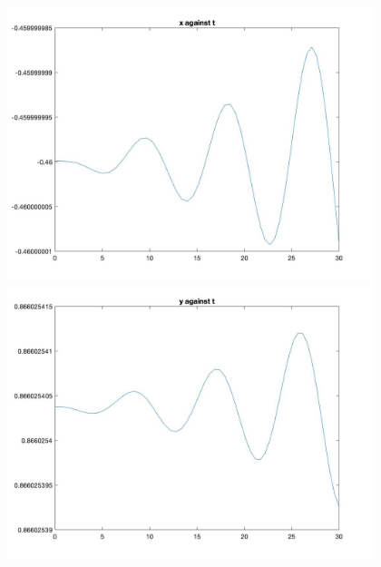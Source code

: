 \documentclass[11pt]{article}
\begin{document}
\begin{figure}[H]
\includegraphics[width = 12cm, height = 8cm]{Q5(22).jpg}\\\includegraphics[width = 12cm, height = 8cm]{Q5(23).jpg}
\end{figure}
\end{document}
